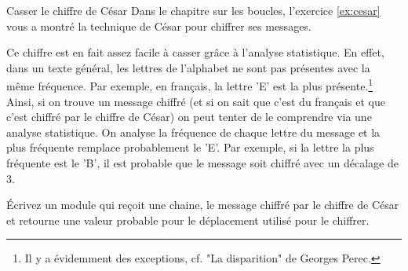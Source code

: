 \begin{Exercice}{Casser le chiffre de César}
	Dans le chapitre sur les boucles, l'exercice \vref{ex:cesar}
	vous a montré la technique de César pour chiffrer ses messages.
	
	Ce chiffre est en fait assez facile à casser grâce à l'analyse statistique.
	En effet, dans un texte général, les lettres de l'alphabet ne sont pas
	présentes avec la même fréquence. 
	Par exemple, en français, la lettre 'E' est la plus présente.\footnote{Il y a
	évidemment des exceptions, cf. "La disparition" de Georges Perec.}
	Ainsi, si on trouve un message chiffré 
	(et si on sait que c'est du français et que c'est chiffré par le chiffre de César)
	on peut tenter de le comprendre via une analyse statistique. 
	On analyse la fréquence de chaque lettre du message et la plus fréquente remplace
	probablement le 'E'. Par exemple, si la lettre la plus fréquente est le 'B',
	il est probable que le message soit chiffré avec un décalage de 3.
	
	Écrivez un module qui reçoit une chaine, 
	le message chiffré par le chiffre de César
	et retourne une valeur probable pour le déplacement utilisé pour le chiffrer.
\end{Exercice}

